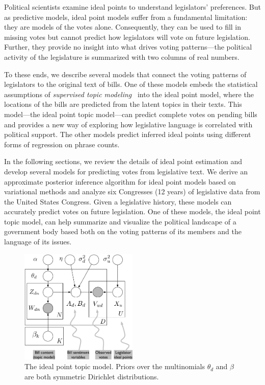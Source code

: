 Political scientists examine ideal points to understand legislators'
preferences.
But as predictive models, ideal point models suffer from a
fundamental limitation: they are models of the votes alone.
Consequently, they can be used to fill in missing votes but cannot
predict how legislators will vote on future legislation.  Further,
they provide no insight into what drives voting patterns---the
political activity of the legislature is summarized with two columns
of real numbers.

To these ends, we describe several models that connect the voting
patterns of legislators to the original text of bills.  One of these
models embeds the statistical assumptions of \textit{supervised topic
modeling}~\cite{blei:2008} into the ideal point model, where the
locations of the bills are predicted from the latent topics in their
texts. This model---the ideal point topic model---can predict complete
votes on pending bills and provides a new way of exploring how
legislative language is correlated with political support.  The other
models predict inferred ideal points using different forms of
regression on phrase counts.

In the following sections, we review the details of ideal point
estimation and develop several models for predicting votes from
legislative text.  We derive an approximate posterior inference
algorithm for ideal point models based on variational methods and
analyze six Congresses (12 years) of legislative data from the United
States Congress.  Given a legislative history, these models can
accurately predict votes on future legislation.  One of these models,
the ideal point topic model, can help summarize and visualize the
political landscape of a government body based both on the voting
patterns of its members and the language of its issues.

\begin{figure}[t]
\center
\includegraphics[width=0.5\textwidth]{chapter_spatial_voting_with_text/figures/ideal-point-topic-model.pdf}
\caption{The ideal point topic model.  Priors over the multinomials
$\theta_d$ and $\beta$ are both symmetric Dirichlet distributions.}
\label{fig:legis_gm}
\end{figure}

